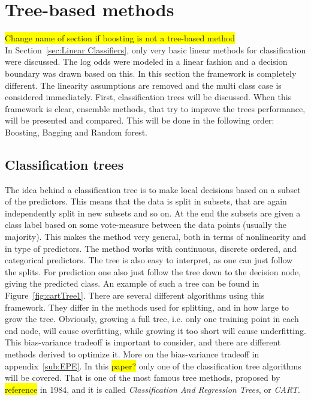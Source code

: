 \section{Tree-based methods}
\label{sec:Tree-based methods}
\colorbox{yellow}{Change name of section if boosting is not a tree-based method}\\
In Section~\ref{sec:Linear Classifiers}, only very basic linear methods for classification were discussed. The log odds were modeled in a linear fashion and a decision boundary was drawn based on this. In this section the framework is completely different. The linearity assumptions are removed and the multi class case is considered immediately. 
First, classification trees will be discussed. When this framework is clear, ensemble methods, that try to improve the trees performance, will be presented and compared. This will be done in the following order: Boosting, Bagging and Random forest. 
%
\subsection{Classification trees}
\label{sub:Classification trees}
The idea behind a classification tree is to make local decisions based on a subset of the predictors. This means that the data is split in subsets, that are again independently split in new subsets and so on. At the end the subsets are given a class label based on some vote-measure between the data points (usually the majority).
This makes the method very general, both in terms of nonlinearity and in type of predictors. The method works with continuous, discrete ordered, and categorical predictors. The tree is also easy to interpret, as one can just follow the splits. For prediction one also just follow the tree down to the decision node, giving the predicted class. An example of such a tree can be found in Figure~\ref{fig:cartTree1}.
There are several different algorithms using this framework. They differ in the methods used for splitting, and in how large to grow the tree. Obviously, growing a full tree, i.e. only one training point in each end node, will cause overfitting, while growing it too short will cause underfitting. This bias-variance tradeoff is important to consider, and there are different methods derived to optimize it. More on the bias-variance tradeoff in appendix~\ref{sub:EPE}. In this \colorbox{yellow}{paper?} only one of the classification tree algorithms will be covered. That is one of the most famous tree methods, proposed by \colorbox{yellow}{reference} \cite{breiman} in 1984, and it is called \textit{Classification And Regression Trees}, or \textit{CART}.
%
